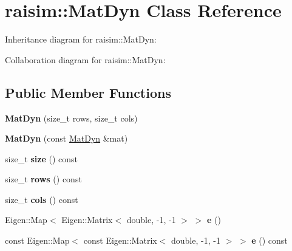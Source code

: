 \hypertarget{classraisim_1_1MatDyn}{}\section{raisim\+:\+:Mat\+Dyn Class Reference}
\label{classraisim_1_1MatDyn}


Inheritance diagram for raisim\+:\+:Mat\+Dyn\+:


Collaboration diagram for raisim\+:\+:Mat\+Dyn\+:
\subsection*{Public Member Functions}
\begin{DoxyCompactItemize}
\item 
\mbox{\label{classraisim_1_1MatDyn_a59d66a66ca98b630965b32938df1c39f}} 
{\bfseries Mat\+Dyn} (size\+\_\+t rows, size\+\_\+t cols)
\item 
\mbox{\label{classraisim_1_1MatDyn_a836d330b91f774e7e232464cd850bddf}} 
{\bfseries Mat\+Dyn} (const \hyperlink{classraisim_1_1MatDyn}{Mat\+Dyn} \&mat)
\item 
\mbox{\label{classraisim_1_1MatDyn_ad7aefee9a311f71d6e21423774238347}} 
size\+\_\+t {\bfseries size} () const
\item 
\mbox{\label{classraisim_1_1MatDyn_a41d4ddd5c3706d4c14b31f0328bfb0e9}} 
size\+\_\+t {\bfseries rows} () const
\item 
\mbox{\label{classraisim_1_1MatDyn_a41622b68cef9337196ee02d23ce3409f}} 
size\+\_\+t {\bfseries cols} () const
\item 
\mbox{\label{classraisim_1_1MatDyn_af7c879b962bd2aebc910cbbd017570bb}} 
Eigen\+::\+Map$<$ Eigen\+::\+Matrix$<$ double, -\/1, -\/1 $>$ $>$ {\bfseries e} ()
\item 
\mbox{\label{classraisim_1_1MatDyn_a6c7b03e84a78d9b25d7dda85b7bad17c}} 
const Eigen\+::\+Map$<$ const Eigen\+::\+Matrix$<$ double, -\/1, -\/1 $>$ $>$ {\bfseries e} () const
\item 
\mbox{\label{classraisim_1_1MatDyn_aa5b69112ef29db2e1526e8f064abd14b}} 

\end{DoxyCompactItemize}
